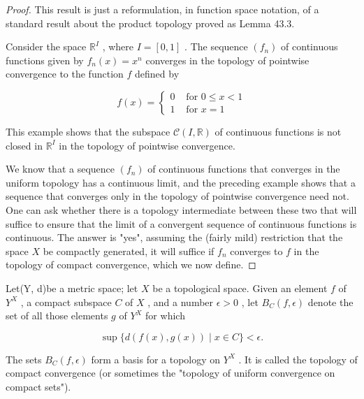 \begin{proof}This result is just a reformulation, in function space notation, of a standard result about the product topology proved as Lemma 43.3.
\begin{example} Consider the space \({\mathbb{R}}^{I}\) , where \(I = \left\lbrack  {0,1}\right\rbrack\) . The sequence \(\left( {f}_{n}\right)\) of continuous functions given by \({f}_{n}\left( x\right)  = {x}^{n}\) converges in the topology of pointwise convergence to the function \(f\) defined by

\[
f\left( x\right)  = \left\{  \begin{array}{ll} 0 & \text{ for }0 \leq  x < 1 \\  1 & \text{ for }x = 1 \end{array}\right.
\]
\end{example}

This example shows that the subspace \(\mathcal{C}\left( {I,\mathbb{R}}\right)\) of continuous functions is not closed in \({\mathbb{R}}^{I}\) in the topology of pointwise convergence.

We know that a sequence \(\left( {f}_{n}\right)\) of continuous functions that converges in the uniform topology has a continuous limit, and the preceding example shows that a sequence that converges only in the topology of pointwise convergence need not. One can ask whether there is a topology intermediate between these two that will suffice to ensure that the limit of a convergent sequence of continuous functions is continuous. The answer is "yes", assuming the (fairly mild) restriction that the space \(X\) be compactly generated, it will suffice if \({f}_{n}\) converges to \(f\) in the topology of compact convergence, which we now define.
\end{proof}
\begin{definition} Let(Y, d)be a metric space; let \(X\) be a topological space. Given an element \(f\) of \({Y}^{X}\) , a compact subspace \(C\) of \(X\) , and a number \(\epsilon  > 0\) , let \({B}_{C}\left( {f,\epsilon }\right)\) denote the set of all those elements \(g\) of \({Y}^{X}\) for which

\[
\sup \{ d\left( {f\left( x\right) ,g\left( x\right) }\right)  \mid  x \in  C\}  < \epsilon .
\]

The sets \({B}_{C}\left( {f,\epsilon }\right)\) form a basis for a topology on \({Y}^{X}\) . It is called the topology of compact convergence (or sometimes the "topology of uniform convergence on compact sets").
\end{definition}

